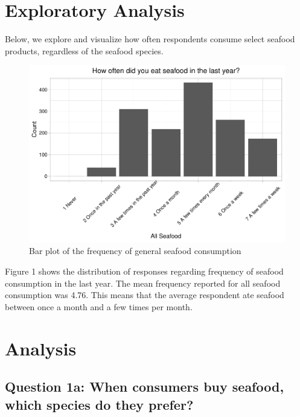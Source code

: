 \documentclass[
  12pt,
]{article}
\begin{document}
\newpage

\hypertarget{exploratory-analysis}{%
\section{Exploratory Analysis}\label{exploratory-analysis}}

Below, we explore and visualize how often respondents consume select
seafood products, regardless of the seafood species.

\begin{figure}
\centering
\includegraphics{Final_rmd_files/figure-latex/freq general-1.pdf}
\caption{Bar plot of the frequency of general seafood consumption}
\end{figure}

Figure 1 shows the distribution of responses regarding frequency of
seafood consumption in the last year. The mean frequency reported for
all seafood consumption was 4.76. This means that the average respondent
ate seafood between once a month and a few times per month.

\newpage

\hypertarget{analysis}{%
\section{Analysis}\label{analysis}}

\hypertarget{question-1a-when-consumers-buy-seafood-which-species-do-they-prefer}{%
\subsection{Question 1a: When consumers buy seafood, which species do
they
prefer?}\label{question-1a-when-consumers-buy-seafood-which-species-do-they-prefer}}
\end{document}

